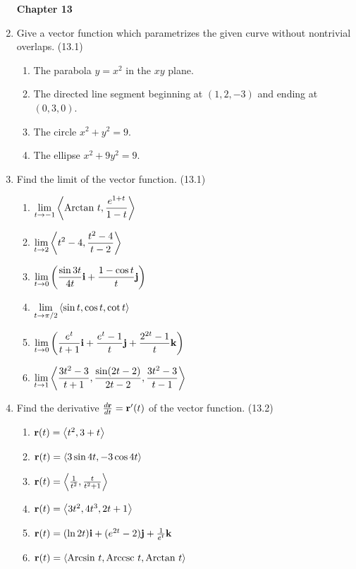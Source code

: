 \begin{enumerate}
\newpage
\centerline{\bf Chapter 13}

    \item Give a vector function which parametrizes the given curve without nontrivial overlaps. (13.1)

      \begin{enumerate}
        \item The parabola $y=x^2$ in the $xy$ plane.
        \item The directed line segment beginning at $(1,2,-3)$ and ending at $(0,3,0)$.
        \item The circle $x^2+y^2=9$.
        \item The ellipse $x^2+9y^2=9$. %
      \end{enumerate}

    \item Find the limit of the vector function. (13.1)

      \begin{enumerate}
        \item $\displaystyle\lim_{t\to -1} \left<\text{Arctan } t, \frac{e^{1+t}}{1-t}\right>$
        \item $\displaystyle\lim_{t\to 2} \left<t^2-4,\frac{t^2-4}{t-2}\right>$
        \item $\displaystyle\lim_{t\to 0} \left(\frac{\sin3t}{4t}\mathbf{i} + \frac{1-\cos t}{t}\mathbf{j}\right)$
        \item $\displaystyle\lim_{t\to \pi/2} \left<\sin t, \cos t, \cot t\right>$
        \item $\displaystyle\lim_{t\to 0} \left(\frac{e^t}{t+1}\mathbf{i}+\frac{e^{t}-1}{t}\mathbf{j}+\frac{2^{2t}-1}{t}\mathbf{k}\right)$
        \item $\displaystyle\lim_{t\to 1} \left<\frac{3t^2-3}{t+1}, \frac{\sin(2t-2)}{2t-2},\frac{3t^2-3}{t-1}\right>$
      \end{enumerate}

    \item Find the derivative $\frac{d\mathbf{r}}{dt}=\mathbf{r}'(t)$ of the vector function. (13.2)

      \begin{enumerate}
        \item $\mathbf{r}(t) = \left<t^2,3+t\right>$
        \item $\mathbf{r}(t) = \left<3\sin4t,-3\cos4t\right>$
        \item $\mathbf{r}(t) = \left<\frac{1}{t^2},\frac{t}{t^2+1}\right>$
        \item $\mathbf{r}(t) = \left<3t^2, 4t^3, 2t+1\right>$
        \item $\mathbf{r}(t) = (\ln 2t)\mathbf{i} + (e^{2t}-2)\mathbf{j} + \frac{1}{e^t}\mathbf{k}$
        \item $\mathbf{r}(t) = \left<\text{Arcsin } t, \text{Arccsc } t, \text{Arctan } t\right>$
      \end{enumerate}


\end{enumerate}
